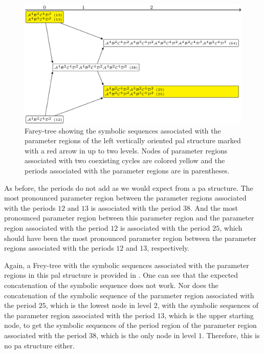 \begin{figure}
	\centering
	\includegraphics[width=.7 \textwidth]{../Figures/7/7.15+17/adding.png}
	\caption[Farey-tree showing the symbolic sequences associated with the parameter regions of a vertically oriented  structure]{
		Farey-tree showing the symbolic sequences associated with the parameter regions of the left vertically oriented \gls{pal} structure marked with a red arrow in  up to two levels.
		Nodes of parameter regions associated with two coexisting cycles are colored yellow and the periods associated with the parameter regions are in parentheses.
	}
	\label{fig:add.add.like.vert.tree}
\end{figure}

As before, the periods do not add as we would expect from a \gls{pa} structure.
The most pronounced parameter region between the parameter regions associated with the periods $12$ and $13$ is associated with the period $38$.
And the most pronounced parameter region between this parameter region and the parameter region associated with the period $12$ is associated with the period $25$, which should have been the most pronounced parameter region between the parameter regions associated with the periods $12$ and $13$, respectively.

Again, a Frey-tree with the symbolic sequences associated with the parameter regions in this \gls{pal} structure is provided in .
One can see that the expected concatenation of the symbolic sequence does not work.
Nor does the concatenation of the symbolic sequence of the parameter region associated with the period $25$, which is the lowest node in level $2$, with the symbolic sequences of the parameter region associated with the period $13$, which is the upper starting node, to get the symbolic sequences of the period region of the parameter region associated with the period $38$, which is the only node in level $1$.
Therefore, this is no \gls{pa} structure either.

